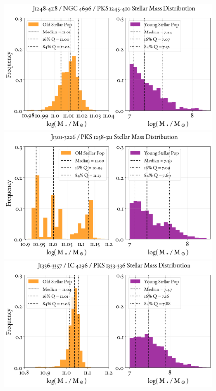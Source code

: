\begin{figure}
    \centering
    \includegraphics[width=0.8\linewidth]{figures/ResultMasses/51_MassDistri_4126.png}\\
    \includegraphics[width=0.8\linewidth]{figures/ResultMasses/52_MassDistri_4164.png}\\
    \includegraphics[width=0.8\linewidth]{figures/ResultMasses/55_MassDistri_4287.png}    
\end{figure}
